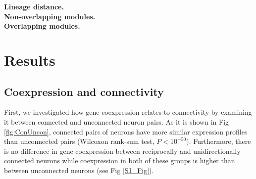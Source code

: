\documentclass[10pt,letterpaper]{article}
\begin{document}
\textbf{Lineage distance.}\\

\textbf{Non-overlapping modules.}\\

\textbf{Overlapping modules.}




\section*{Results}

\subsection*{Coexpression and connectivity}

First, we investigated how gene coexpression relates to connectivity by examining it between connected and unconnected neuron pairs.
As it is shown in Fig \ref{fig:ConUncon}, connected pairs of neurons have more similar expression profiles than unconnected pairs (Wilcoxon rank-sum test, $P < 10^{-50}$). Furthermore, there is no difference in gene coexpression between reciprocally and unidirectionally connected neurons while coexpression in both of these groups is higher than between unconnected neurons (see Fig \ref{S1_Fig}). \\
\end{document}
